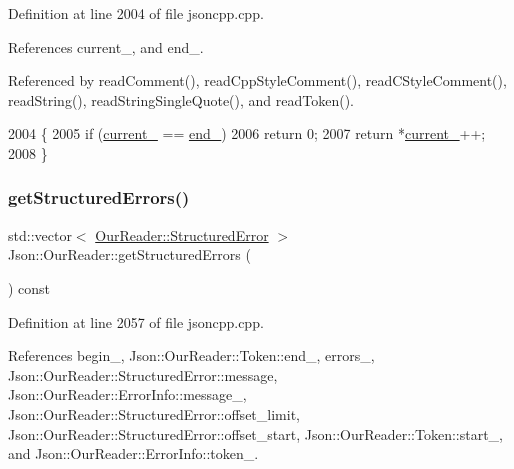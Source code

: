 Definition at line 2004 of file jsoncpp.\+cpp.



References current\+\_\+, and end\+\_\+.



Referenced by read\+Comment(), read\+Cpp\+Style\+Comment(), read\+C\+Style\+Comment(), read\+String(), read\+String\+Single\+Quote(), and read\+Token().


\begin{DoxyCode}
2004                                      \{
2005   \textcolor{keywordflow}{if} (\hyperlink{class_json_1_1_our_reader_a5211fbbba94be80a22dd2317c621efcc}{current\_} == \hyperlink{class_json_1_1_our_reader_ab1f69b0260c27a0d2d65dc56e42c8f9d}{end\_})
2006     \textcolor{keywordflow}{return} 0;
2007   \textcolor{keywordflow}{return} *\hyperlink{class_json_1_1_our_reader_a5211fbbba94be80a22dd2317c621efcc}{current\_}++;
2008 \}
\end{DoxyCode}
\mbox{\label{class_json_1_1_our_reader_a0eb2420a6bef89a3f3256191e6e3de6d}} 
\subsubsection{\texorpdfstring{get\+Structured\+Errors()}{getStructuredErrors()}}
{\footnotesize\ttfamily std\+::vector$<$ \hyperlink{struct_json_1_1_our_reader_1_1_structured_error}{Our\+Reader\+::\+Structured\+Error} $>$ Json\+::\+Our\+Reader\+::get\+Structured\+Errors (\begin{DoxyParamCaption}{ }\end{DoxyParamCaption}) const}



Definition at line 2057 of file jsoncpp.\+cpp.



References begin\+\_\+, Json\+::\+Our\+Reader\+::\+Token\+::end\+\_\+, errors\+\_\+, Json\+::\+Our\+Reader\+::\+Structured\+Error\+::message, Json\+::\+Our\+Reader\+::\+Error\+Info\+::message\+\_\+, Json\+::\+Our\+Reader\+::\+Structured\+Error\+::offset\+\_\+limit, Json\+::\+Our\+Reader\+::\+Structured\+Error\+::offset\+\_\+start, Json\+::\+Our\+Reader\+::\+Token\+::start\+\_\+, and Json\+::\+Our\+Reader\+::\+Error\+Info\+::token\+\_\+.


